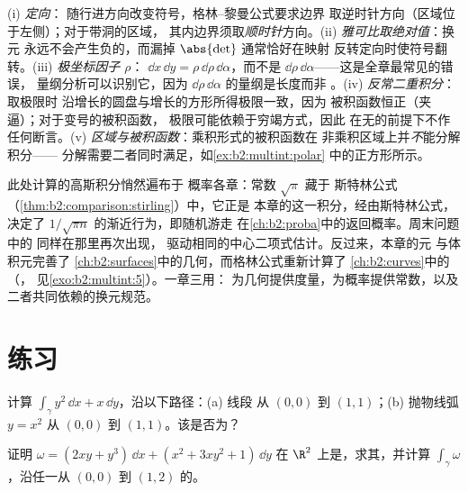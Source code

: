 \begin{remark}[常见易错点]
(i) \emph{定向}：
随行进方向改变符号，格林--黎曼公式要求边界
取逆时针方向（区域位于左侧）；对于带洞的区域，
其内边界须取\emph{顺时针}方向。(ii)
\emph{雅可比取绝对值}：换元
永远不会产生负的，而漏掉
$\abs{\det}$ 通常恰好在映射
反转定向时使符号翻转。(iii) \emph{极坐标因子 $\rho$}：
$\dd x\,\dd y = \rho\,\dd\rho\,\dd\alpha$，而不是
$\dd\rho\,\dd\alpha$——这是全章最常见的错误，
量纲分析可以识别它，因为
$\dd\rho\,\dd\alpha$ 的量纲是长度而非
。(iv) \emph{反常二重积分}：取极限时
沿增长的圆盘与增长的方形所得极限一致，因为
被积函数恒正（夹逼）；对于变号的被积函数，
极限可能依赖于穷竭方式，因此
在无的前提下不作任何断言。(v)
\emph{区域与被积函数}：乘积形式的被积函数在
非乘积区域上并\emph{不}能分解积分——
分解需要二者同时满足，如\cref{ex:b2:multint:polar}
中的正方形所示。
\end{remark}

\begin{remark}[本册内的几个视角]
此处计算的高斯积分悄然遍布于
概率各章：常数 $\sqrt\pi$ 藏于
斯特林公式（\cref{thm:b2:comparison:stirling}）中，它正是
本章的这一积分，经由斯特林公式，决定了
$1/\sqrt{\pi n}$ 的渐近行为，即随机游走
在\cref{ch:b2:proba}中的返回概率。周末问题中的
同样在那里再次出现，
驱动相同的中心二项式估计。反过来，本章的元
与体积元完善了
\cref{ch:b2:surfaces}中的几何，而格林公式重新计算了
\cref{ch:b2:curves}中的（，
见\cref{exo:b2:multint:5}）。一章三用：
为几何提供度量，为概率提供常数，以及
二者共同依赖的换元规范。
\end{remark}

\section{练习}

\begin{exercise}[$\star$]\label{exo:b2:multint:1}
计算 $\int_\gamma y^2\,\dd x + x\,\dd y$，沿以下路径：(a) 线段
从 $(0,0)$ 到 $(1,1)$；(b) 抛物线弧 $y = x^2$ 从
$(0,0)$ 到 $(1,1)$。该是否为？
\end{exercise}

\begin{exercise}[$\star$]\label{exo:b2:multint:2}
证明 $\omega = (2xy + y^3)\,\dd x + (x^2 + 3xy^2 + 1)\,\dd y$
在 $\R^2$ 上是，求其，并计算
$\int_\gamma\omega$，沿任一从 $(0, 0)$ 到 $(1, 2)$ 的。
\end{exercise}

